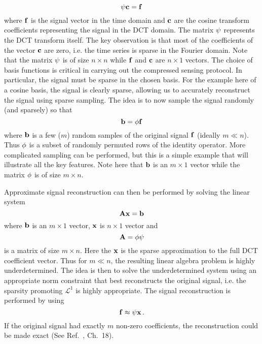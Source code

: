 \documentclass[final,leqno]{siamltexmm2}
\begin{document}
%
\begin{equation}
  {\bf \psi} {\bf c}={\bf f}
\end{equation}
%
where ${\bf f}$ is the signal vector in the time domain and ${\bf c}$
are the cosine transform coefficients representing the
signal in the DCT domain.  The matrix
${\bf \psi}$ represents the DCT transform itself.  The
key observation is that most of the coefficients of 
the vector ${\bf c}$ are zero, i.e. the time series is sparse in the Fourier domain.  
Note that the matrix ${\bf \psi}$ is
of size $n\times n$ while ${\bf f}$ and ${\bf c}$ are $n\times 1$
vectors.  The choice of basis functions is critical in carrying out
the compressed sensing protocol.  In particular, the signal
must be sparse in the chosen basis.  For the example here
of a cosine basis, the signal is clearly sparse, allowing us
to accurately reconstruct the signal using sparse sampling.
The idea is to now sample the signal randomly (and sparsely)
so that
%
\begin{equation}
     {\bf b}= {\bf \phi} {\bf f}
\end{equation}
%
where ${\bf b}$ is a few ($m$) random samples of the
original signal ${\bf f}$ (ideally $m\ll n$).  
Thus ${\bf \phi}$ is a subset
of randomly permuted rows of the identity operator.
More complicated sampling can be performed, but this
is a simple example that will illustrate all the key features.
Note here that ${\bf b}$ is an $m\times 1$ vector while
the matrix ${\bf \phi}$ is of size $m\times n$.



Approximate signal reconstruction can then be performed
by solving the linear system
%
\begin{equation}
  {\bf A}{\bf x}={\bf b}
\end{equation}
%
where ${\bf b}$ is an $m\times 1$ vector, ${\bf x}$ 
is $n\times 1$ vector and
%
\begin{equation}
  {\bf A} = {\bf \phi}{\bf \psi}
\end{equation}
%
is a matrix of size $m\times n$.  Here the ${\bf x}$ is
the sparse approximation to the full DCT coefficient
vector.  Thus for $m\ll n$, the
resulting linear algebra problem is highly underdetermined.  The idea is then to solve the
underdetermined system using an appropriate norm constraint that
best reconstructs the original signal, i.e. the sparsity promoting $\mathcal{L}^{1}$ is highly appropriate.  The signal reconstruction
is performed by using
%
\begin{equation}
   {\bf f}\approx{\bf \psi} {\bf x} \, .
   \label{eq:cs_reconstruct}
\end{equation}
%
If the original signal had exactly $m$ non-zero coefficients,
the reconstruction could be made exact (See Ref.~\cite{Kutz}, Ch.~18).
\end{document}
